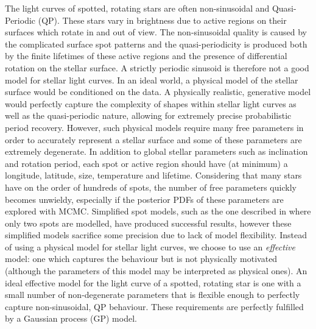 The light curves of spotted, rotating stars are often non-sinusoidal and
Quasi-Periodic (QP).
These stars vary in brightness due to active regions on their surfaces which
rotate in and out of view.
The non-sinusoidal quality is caused by the complicated surface spot patterns
and the quasi-periodicity is produced both by the finite lifetimes of these
active regions and the presence of differential rotation on the stellar
surface.
A strictly periodic sinusoid is therefore not a good model for stellar light
curves.
In an ideal world, a physical model of the stellar surface would be
conditioned on the data.
A physically realistic, generative model would perfectly capture the complexity
of shapes within stellar light curves as well as the quasi-periodic nature,
allowing for extremely precise probabilistic period recovery.
However, such physical models require many free parameters in order to
accurately represent a stellar surface and some of these parameters are
extremely degenerate.
In addition to global stellar parameters such as inclination and rotation
period, each spot or active region should have (at minimum) a longitude,
latitude, size, temperature and lifetime.
Considering that many stars have on the order of hundreds of spots, the number
of free parameters quickly becomes unwieldy, especially if the posterior PDFs
of these parameters are explored with MCMC.
Simplified spot models, such as the one described in \citet{Lanza2014} where
only two spots are modelled, have produced successful results, however these
simplified models sacrifice some precision due to lack of model flexibility.
Instead of using a physical model for stellar light curves, we choose to use
an {\it effective} model: one which captures the behaviour but is not
physically motivated (although the parameters of this model may be interpreted
as physical ones).
An ideal effective model for the light curve of a spotted, rotating star is
one with a small number of non-degenerate parameters that is flexible enough
to perfectly capture non-sinusoidal, QP behaviour.
These requirements are perfectly fulfilled by a Gaussian process (GP) model.

